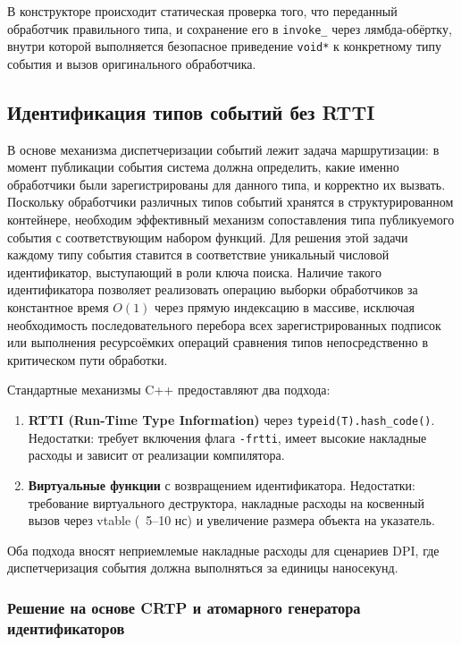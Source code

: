 В конструкторе происходит статическая проверка того, что переданный обработчик правильного типа,
и сохранение его в \texttt{invoke\_} через лямбда-обёртку, внутри которой выполняется безопасное приведение \texttt{void*} к конкретному типу события и вызов оригинального обработчика.

\subsection{Идентификация типов событий без RTTI}

В основе механизма диспетчеризации событий лежит задача маршрутизации: в момент публикации события система должна определить, какие именно обработчики были зарегистрированы для данного типа, и корректно их вызвать.
Поскольку обработчики различных типов событий хранятся в структурированном контейнере, необходим эффективный механизм сопоставления типа публикуемого события с соответствующим набором функций.
Для решения этой задачи каждому типу события ставится в соответствие уникальный числовой идентификатор, выступающий в роли ключа поиска.
Наличие такого идентификатора позволяет реализовать операцию выборки обработчиков за константное время $O(1)$ через прямую индексацию в массиве, исключая необходимость последовательного перебора всех зарегистрированных подписок или выполнения ресурсоёмких операций сравнения типов непосредственно в критическом пути обработки.

Стандартные механизмы C++ предоставляют два подхода:

\begin{enumerate}
    \item \textbf{RTTI (Run-Time Type Information)} через \texttt{typeid(T).hash\_code()}. Недостатки: требует включения флага \texttt{-frtti}, имеет высокие накладные расходы \cite{guntheroth2016optimized} и зависит от реализации компилятора.

    \item \textbf{Виртуальные функции} с возвращением идентификатора. Недостатки: требование виртуального деструктора, накладные расходы на косвенный вызов через vtable (~5--10 нс) и увеличение размера объекта на указатель.
\end{enumerate}

Оба подхода вносят неприемлемые накладные расходы для сценариев DPI, где диспетчеризация события должна выполняться за единицы наносекунд.

\subsubsection{Решение на основе CRTP и атомарного генератора идентификаторов}


